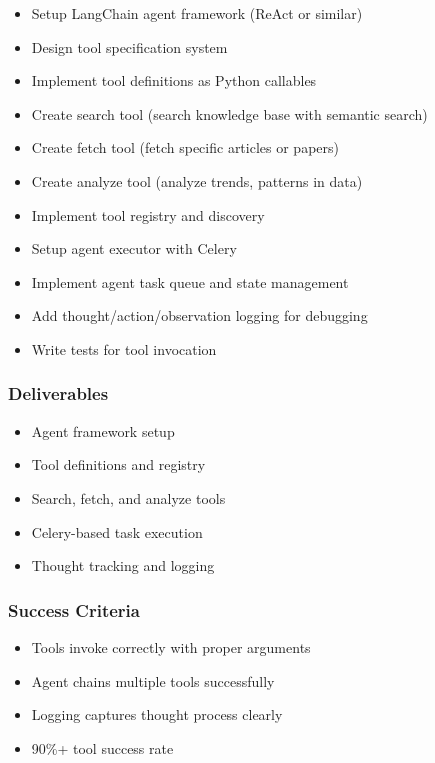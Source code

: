 \documentclass[12pt,oneside]{report}
\begin{document}
\begin{itemize}
    \item Setup LangChain agent framework (ReAct or similar)
    \item Design tool specification system
    \item Implement tool definitions as Python callables
    \item Create search tool (search knowledge base with semantic search)
    \item Create fetch tool (fetch specific articles or papers)
    \item Create analyze tool (analyze trends, patterns in data)
    \item Implement tool registry and discovery
    \item Setup agent executor with Celery
    \item Implement agent task queue and state management
    \item Add thought/action/observation logging for debugging
    \item Write tests for tool invocation
\end{itemize}

\subsubsection{Deliverables}

\begin{itemize}
    \item Agent framework setup
    \item Tool definitions and registry
    \item Search, fetch, and analyze tools
    \item Celery-based task execution
    \item Thought tracking and logging
\end{itemize}

\subsubsection{Success Criteria}

\begin{itemize}
    \item Tools invoke correctly with proper arguments
    \item Agent chains multiple tools successfully
    \item Logging captures thought process clearly
    \item 90\%+ tool success rate
\end{itemize}
\end{document}
